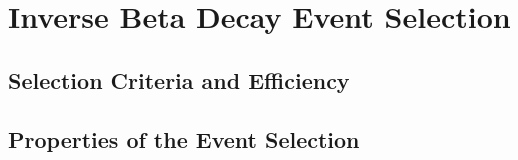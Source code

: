 \chapter{Inverse Beta Decay Event Selection}

\section{Selection Criteria and Efficiency}

\section{Properties of the Event Selection}

